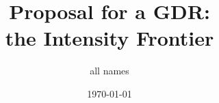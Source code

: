 \documentclass{article}
\title{Proposal for a GDR:\\ the Intensity Frontier } %
\author{ all names } %
\date{\today} %
\begin{document}
\maketitle %

\begin{center}
\begin{tabular}{l r}
\end{tabular}
\end{center}



\linenumbers























\end{document}
